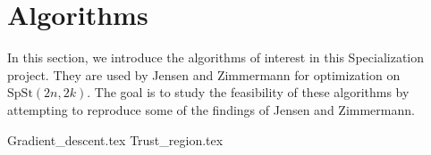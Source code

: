 \section{Algorithms}
In this section, we introduce the algorithms of interest in this Specialization project. They are used by Jensen and Zimmermann for optimization on $\mathrm{SpSt}(2n, 2k)$. The goal is to study the feasibility of these algorithms by attempting to reproduce some of the findings of Jensen and Zimmermann. 

{Gradient_descent.tex}
{Trust_region.tex}